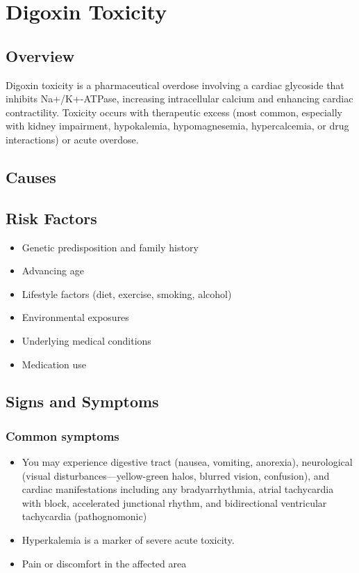 \chapter{Digoxin Toxicity}
\label{sec:Digoxin Toxicity}

\section{Overview}
Digoxin toxicity is a pharmaceutical overdose involving a cardiac glycoside that inhibits Na+/K+-ATPase, increasing intracellular calcium and enhancing cardiac contractility. Toxicity occurs with therapeutic excess (most common, especially with kidney impairment, hypokalemia, hypomagnesemia, hypercalcemia, or drug interactions) or acute overdose.
\section{Causes}
\section{Risk Factors}

\begin{itemize}[noitemsep]
  \item Genetic predisposition and family history
  \item Advancing age
  \item Lifestyle factors (diet, exercise, smoking, alcohol)
  \item Environmental exposures
  \item Underlying medical conditions
  \item Medication use
\end{itemize}
\section{Signs and Symptoms}

\subsection{Common symptoms}
\begin{itemize}[noitemsep]
  \item You may experience digestive tract (nausea, vomiting, anorexia), neurological (visual disturbances---yellow-green halos, blurred vision, confusion), and cardiac manifestations including any bradyarrhythmia, atrial tachycardia with block, accelerated junctional rhythm, and bidirectional ventricular tachycardia (pathognomonic)
  \item Hyperkalemia is a marker of severe acute toxicity.
  \item Pain or discomfort in the affected area
  \end{itemize}

